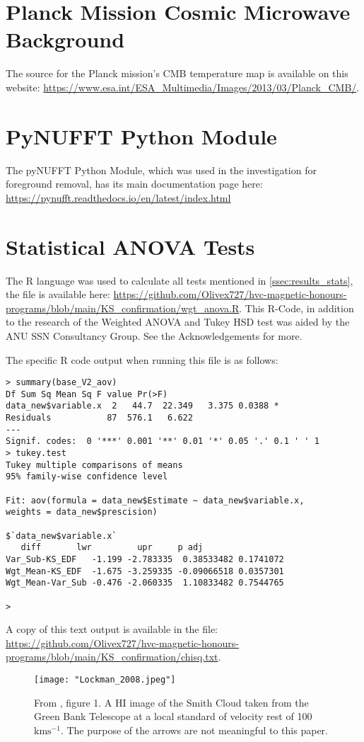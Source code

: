 \section{Planck Mission Cosmic Microwave Background}
\label{sec:appendixC}

The source for the Planck mission's CMB temperature map is available on this website: \url{https://www.esa.int/ESA_Multimedia/Images/2013/03/Planck_CMB/}.

\section{PyNUFFT Python Module}
\label{sec:appendixD}

The pyNUFFT Python Module, which was used in the investigation for foreground removal, has its main documentation page here: \url{https://pynufft.readthedocs.io/en/latest/index.html}

\newpage

\section{Statistical ANOVA Tests}
\label{sec:appendixE}

The R language was used to calculate all tests mentioned in \ref{ssec:results_stats}, the file is available here: \url{https://github.com/Olivex727/hvc-magnetic-honours-programs/blob/main/KS_confirmation/wgt_anova.R}. This R-Code, in addition to the research of the Weighted ANOVA and Tukey HSD test was aided by the ANU SSN Consultancy Group. See the Acknowledgements for more.

The specific R code output when running this file is as follows:

\begin{verbatim}
> summary(base_V2_aov)
Df Sum Sq Mean Sq F value Pr(>F)  
data_new$variable.x  2   44.7  22.349   3.375 0.0388 *
Residuals           87  576.1   6.622                 
---
Signif. codes:  0 '***' 0.001 '**' 0.01 '*' 0.05 '.' 0.1 ' ' 1
> tukey.test
Tukey multiple comparisons of means
95% family-wise confidence level

Fit: aov(formula = data_new$Estimate ~ data_new$variable.x,
weights = data_new$prescision)

$`data_new$variable.x`
   diff       lwr         upr     p adj
Var_Sub-KS_EDF   -1.199 -2.783335  0.38533482 0.1741072
Wgt_Mean-KS_EDF  -1.675 -3.259335 -0.09066518 0.0357301
Wgt_Mean-Var_Sub -0.476 -2.060335  1.10833482 0.7544765

> 
\end{verbatim}

A copy of this text output is available in the file: \url{https://github.com/Olivex727/hvc-magnetic-honours-programs/blob/main/KS_confirmation/chisq.txt}.

\begin{figure}
    \renewcommand\thefigure{A}
    \texttt{[image: "Lockman\_2008.jpeg"]}
    \centering
    \caption{From \cite{ID28}, figure 1. A HI image of the Smith Cloud taken from the Green Bank Telescope at a local standard of velocity rest of 100 $\mathrm{kms^{-1}}$. The purpose of the arrows are not meaningful to this paper.}
    \label{fig:sc}
\end{figure}